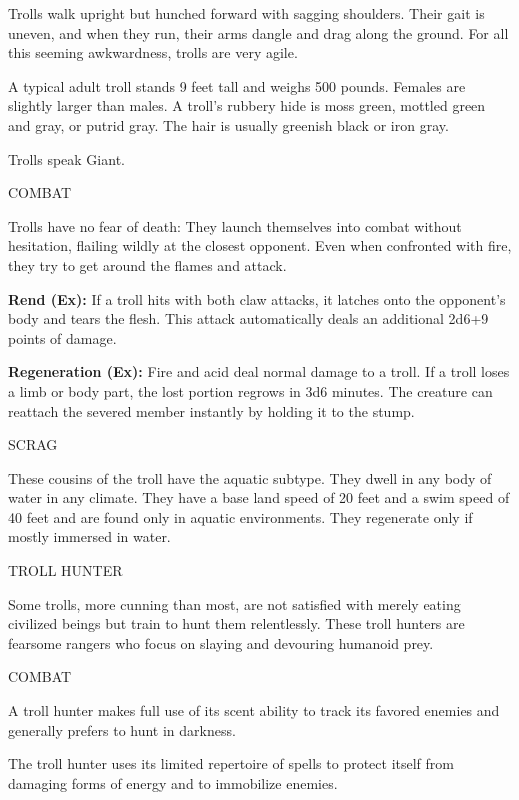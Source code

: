 \documentclass{article}
\begin{document}
\vspace{12pt}
Trolls walk upright but hunched forward with sagging shoulders. Their gait is uneven, 
and when they run, their arms dangle and drag along the ground. For all this seeming 
awkwardness, trolls are very agile.

A typical adult troll stands 9 feet tall and weighs 500 pounds. Females are slightly 
larger than males. A troll's rubbery hide is moss green, mottled green and gray, 
or putrid gray. The hair is usually greenish black or iron gray.

Trolls speak Giant.

COMBAT

Trolls have no fear of death: They launch themselves into combat without hesitation, 
flailing wildly at the closest opponent. Even when confronted with fire, they try 
to get around the flames and attack.

\textbf{Rend (Ex): }If a troll hits with both claw attacks, it latches onto the 
opponent's body and tears the flesh. This attack automatically deals an additional 
2d6+9 points of damage.

\textbf{Regeneration (Ex): }Fire and acid deal normal damage to a troll. If a troll 
loses a limb or body part, the lost portion regrows in 3d6 minutes. The creature 
can reattach the severed member instantly by holding it to the stump.

\vspace{12pt}
SCRAG

These cousins of the troll have the aquatic subtype. They dwell in any body of 
water in any climate. They have a base land speed of 20 feet and a swim speed of 
40 feet and are found only in aquatic environments. They regenerate only if mostly 
immersed in water. 

\vspace{12pt}
TROLL HUNTER

Some trolls, more cunning than most, are not satisfied with merely eating civilized 
beings but train to hunt them relentlessly. These troll hunters are fearsome rangers 
who focus on slaying and devouring humanoid prey.

COMBAT

A troll hunter makes full use of its scent ability to track its favored enemies 
and generally prefers to hunt in darkness.

The troll hunter uses its limited repertoire of spells to protect itself from damaging 
forms of energy and to immobilize enemies.
\end{document}
